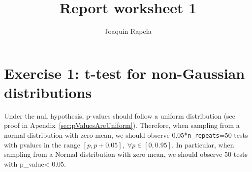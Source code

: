 \documentclass[12pt]{article}
\title{Report worksheet 1}
\author{Joaqu\'{i}n Rapela}
\begin{document}
\maketitle

\section*{Exercise 1: t-test for non-Gaussian distributions}

Under the null hypothesis, p-values should follow a uniform distribution (see
proof in Apendix~\ref{sec:pValuesAreUniform}). Therefore, when sampling from a
normal distribution with zero mean, we should observe
0.05*\texttt{n\_repeats}=50 tests with pvalues in the range $[p,
p+0.05],\;\forall p\in[0, 0.95]$. In particular, when sampling from a Normal
distribution with zero mean, we should observe 50 tests with p\_value\textless
0.05.
\end{document}
